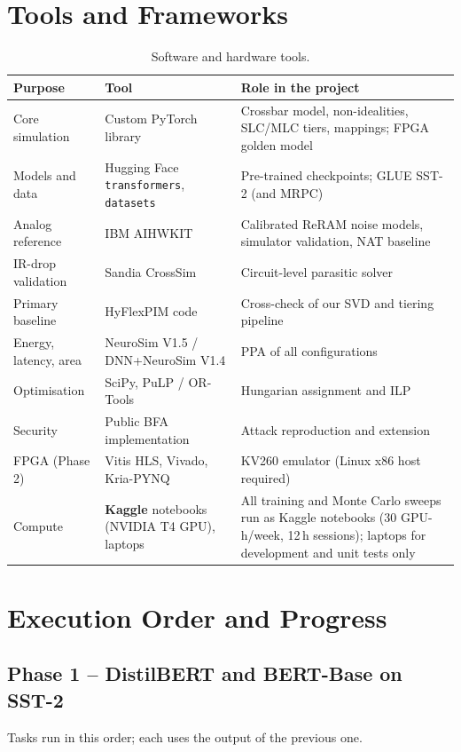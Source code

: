\documentclass[10pt,a4paper]{article}
\begin{document}
\section{Tools and Frameworks}

\begin{table}[h]
\centering\small
\caption{Software and hardware tools.}
\begin{tabularx}{\linewidth}{@{}l l X@{}}
\toprule
Purpose & Tool & Role in the project \\
\midrule
Core simulation & Custom PyTorch library & Crossbar model, non-idealities, SLC/MLC tiers, mappings; FPGA golden model \\
Models and data & Hugging Face \texttt{transformers}, \texttt{datasets} & Pre-trained checkpoints; GLUE SST-2 (and MRPC) \\
Analog reference & IBM AIHWKIT & Calibrated ReRAM noise models, simulator validation, NAT baseline \\
IR-drop validation & Sandia CrossSim & Circuit-level parasitic solver \\
Primary baseline & HyFlexPIM code & Cross-check of our SVD and tiering pipeline \\
Energy, latency, area & NeuroSim V1.5 / DNN+NeuroSim V1.4 & PPA of all configurations \\
Optimisation & SciPy, PuLP / OR-Tools & Hungarian assignment and ILP \\
Security & Public BFA implementation & Attack reproduction and extension \\
FPGA (Phase 2) & Vitis HLS, Vivado, Kria-PYNQ & KV260 emulator (Linux x86 host required) \\
Compute & \textbf{Kaggle} notebooks (NVIDIA T4 GPU), laptops & All training and Monte Carlo sweeps run as Kaggle notebooks (30 GPU-h/week, 12\,h sessions); laptops for development and unit tests only \\
\bottomrule
\end{tabularx}
\end{table}

\section{Execution Order and Progress}

\subsection{Phase 1 -- DistilBERT and BERT-Base on SST-2}
Tasks run in this order; each uses the output of the previous one.
\end{document}
